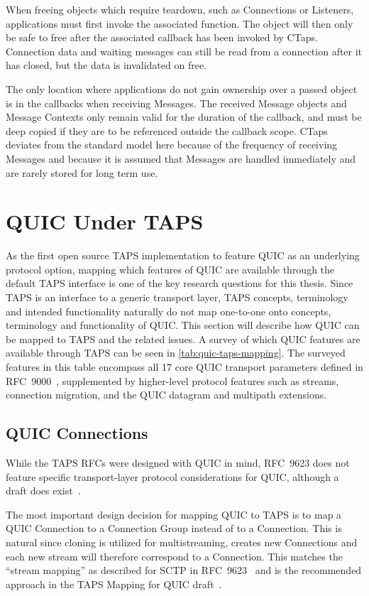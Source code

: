 When freeing objects which require teardown, such as Connections
or Listeners, applications must first
invoke the associated  function. The object
will then only be safe to free after the associated 
callback has been invoked by CTaps.
Connection data and waiting messages can still be read from a connection after it has
closed, but the data is invalidated on free.

The only location where applications do not gain ownership over a passed object is in
the  callbacks when receiving Messages. 
The received Message objects and Message Contexts only remain valid for the duration
of the callback, and must be deep copied if they are to be referenced outside the
callback scope. CTaps deviates from the standard model here because of the frequency
of receiving Messages and because it is assumed that Messages are handled immediately
and are rarely stored for long term use.

\section{QUIC Under TAPS} \label{sec:quicUnderTaps}
As the first open source TAPS implementation to feature QUIC as
an underlying protocol option, mapping which features of
QUIC are available through the default TAPS interface is one of the
key research questions for this thesis. Since TAPS is an interface to
a generic transport layer, TAPS concepts, terminology and intended functionality
naturally do not map one-to-one onto concepts, terminology and functionality
of QUIC. This section will describe how QUIC can be mapped to TAPS and the
related issues. A survey of which QUIC features are available
through TAPS can be seen in \cref{tab:quic-taps-mapping}. The surveyed features
in this table encompass all 17 core QUIC transport parameters defined in
RFC~9000~\cite[sec.~18.2]{rfc9000}, supplemented by higher-level protocol features such as streams,
connection migration, and the QUIC datagram and multipath extensions.

\subsection{QUIC Connections} \label{sec:quic-arch-mapping}
While the TAPS RFCs were designed with QUIC in mind,
RFC~9623 does not feature specific transport-layer protocol considerations for QUIC,
although a draft does exist~\cite{transportServicesMappingForQuic}.

The most important design decision for mapping QUIC 
to TAPS is to map a QUIC Connection
to a Connection Group instead of to a Connection.
This is natural since cloning is utilized for multistreaming, 
creates new Connections and each new stream will therefore correspond to a Connection. This matches
the \enquote{stream mapping} as described for SCTP in RFC~9623~\cite[sec.~10.6]{rfc9623}
and is the recommended approach in the TAPS Mapping for QUIC
draft~\cite[sec.~1]{transportServicesMappingForQuic}.


